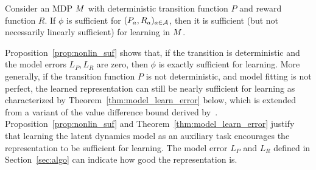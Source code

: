 \begin{proposition}
\label{prop:nonlin_suf}
Consider an MDP $M$ with deterministic transition function $P$ and reward function $R$. If $\phi$ is sufficient for $(P_a, R_a)_{a\in\mathcal{A}}$, then it is sufficient (but not necessarily linearly sufficient) 
for learning in $M$.
\end{proposition}
Proposition~\ref{prop:nonlin_suf} shows that, if the transition is deterministic and the model errors $L_P,L_R$ are zero, then $\phi$ is exactly sufficient for learning.
More generally, if the transition function $P$ is not deterministic, and model fitting is not perfect, the learned representation can still be nearly sufficient for learning as characterized by Theorem~\ref{thm:model_learn_error} below, which is extended from a variant of the value difference bound derived by~\citet{gelada2019deepmdp}. 
Proposition~\ref{prop:nonlin_suf} and Theorem~\ref{thm:model_learn_error} justify that learning the latent dynamics model as an auxiliary task encourages the representation to be sufficient for learning. The model error $L_P$ and $L_R$ defined in Section~\ref{sec:algo} can indicate how good the representation is.

